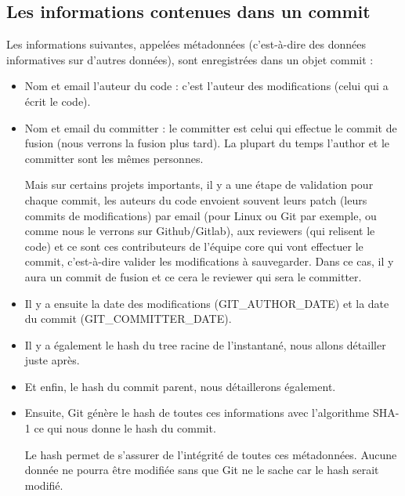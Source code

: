 \documentclass{article}
\begin{document}
\subsection{Les informations contenues dans un {\color{blue}commit}}
Les informations suivantes, appelées métadonnées (c'est-à-dire des données informatives sur d'autres données), sont enregistrées dans un objet {\color{blue}commit }:
\begin{itemize}
\item Nom et email l'auteur du code : c'est l'auteur des modifications (celui qui a écrit le code).

\item Nom et email du {\color{blue}committer} : le {\color{blue}committer} est celui qui effectue le commit de fusion (nous verrons la fusion plus tard). La plupart du temps l'{\color{blue}author} et le {\color{blue}committer} sont les mêmes personnes.

Mais sur certains projets importants, il y a une étape de validation pour chaque {\color{blue}commit}, les auteurs du code envoient souvent leurs {\color{blue}patch} (leurs {\color{blue}commits} de modifications) par email (pour {\color{blue}Linux} ou {\color{blue}Git} par exemple, ou comme nous le verrons sur {\color{blue}Github/Gitlab}), aux {\color{blue}reviewers} (qui relisent le code) et ce sont ces contributeurs de l'équipe {\color{blue}core} qui vont effectuer le {\color{blue}commit}, c'est-à-dire valider les modifications à sauvegarder. Dans ce cas, il y aura un commit de fusion et ce cera le {\color{blue}reviewer} qui sera le {\color{blue}committer}.

\item Il y a ensuite la date des modifications ({\color{blue}GIT\_AUTHOR\_DATE}) et la date du commit ({\color{blue}GIT\_COMMITTER\_DATE}).

\item Il y a également le {\color{blue}hash} du tree racine de l'instantané, nous allons détailler juste après.

\item Et enfin, le {\color{blue}hash} du commit parent, nous détaillerons également.

\item Ensuite, {\color{blue}Git} génère le {\color{blue}hash} de toutes ces informations avec l'algorithme {\color{blue}SHA-1} ce qui nous donne le {\color{blue}hash} du commit.

Le {\color{blue}hash} permet de s'assurer de l'intégrité de toutes ces métadonnées. Aucune donnée ne pourra être modifiée sans que {\color{blue}Git} ne le sache car le {\color{blue}hash} serait modifié.

\end{itemize}
\end{document}
